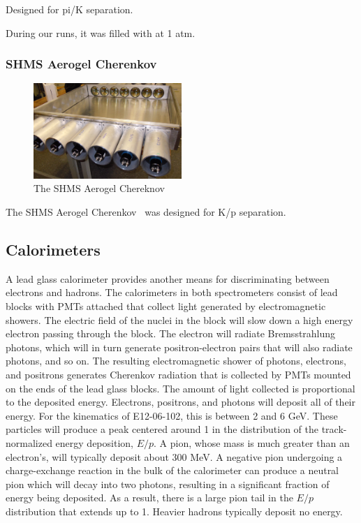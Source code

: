 Designed for pi/K separation.

During our runs, it was filled with  at 1 atm.

\subsubsection{SHMS Aerogel Cherenkov}
\begin{figure}[ht]
    \centering
    \includegraphics[width=0.5\textwidth]{chap3/shms_aerogel_open.jpg}
    \caption{The SHMS Aerogel Chereknov }
    \label{fig:shms_hgcer}
\end{figure}

The SHMS Aerogel Cherenkov~\cite{Horn_2017} was designed for K/p separation.

\subsection{Calorimeters}
A lead glass calorimeter provides another means for discriminating between
electrons and hadrons.
The calorimeters in both spectrometers consist of lead blocks with
PMTs attached that collect light generated by electromagnetic showers.
The electric field of the nuclei in the block will slow down a high energy
electron passing through the block.
The electron will radiate Bremsstrahlung photons, which will in turn generate
positron-electron pairs that will also radiate photons, and so on.
The resulting electromagnetic shower of photons, electrons, and positrons
generates Cherenkov radiation that is collected by PMTs mounted on the ends
of the lead glass blocks.
The amount of light collected is proportional to the deposited energy.
Electrons, positrons, and photons will deposit all of their energy.
For the kinematics of E12-06-102, this is between 2 and 6 GeV.
These particles will produce a peak centered around 1 in the distribution of
the track-normalized energy deposition, $E/p$.
A pion, whose mass is much greater than an electron's, will typically deposit
about 300 MeV.
A negative pion undergoing a charge-exchange reaction in the bulk of the
calorimeter can produce a neutral pion which will decay into two photons,
resulting in a significant fraction of energy being deposited.
As a result, there is a large pion tail in the $E/p$ distribution that extends
up to 1.
Heavier hadrons typically deposit no energy.

